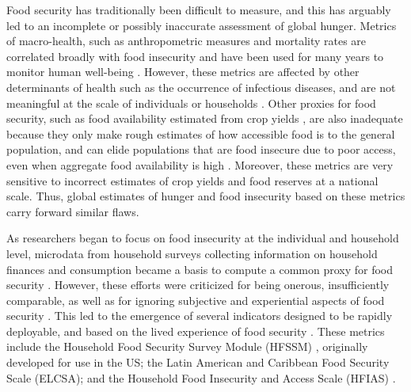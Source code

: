 \documentclass{article}
\begin{document}
Food security has traditionally been difficult to measure, and this has arguably led to an incomplete or possibly inaccurate assessment of global hunger. Metrics of macro-health, such as anthropometric measures and mortality rates are correlated broadly with food insecurity and have been used for many years to monitor human well-being \citep{Puffer1973, Habicht1974}.  However, these metrics are affected by other determinants of health such as the occurrence of infectious diseases, and are not meaningful at the scale of individuals or households \citep{Perumal2018}.  Other proxies for food security, such as food availability estimated from crop yields \citep{Maxwell1992}, are also inadequate because they only make rough estimates of how accessible food is to the general population, and can elide populations that are food insecure due to poor access, even when aggregate food availability is high \citep{Sen1983}.  Moreover, these metrics are very sensitive to incorrect estimates of crop yields and food reserves at a national scale.  Thus, global estimates of hunger and food insecurity based on these metrics carry forward similar flaws.

As researchers began to focus on food insecurity at the individual and household level, microdata from household surveys collecting information on household finances and consumption became a basis to compute a common proxy for food security \citep{Haddad1994}.  However, these efforts were criticized for being onerous, insufficiently comparable, as well as for ignoring subjective and experiential aspects of food security \citep{Maxwell1996}.  This led to the emergence of several indicators designed to be rapidly deployable, and based on the lived experience of food security \citep{Jones2013}.  These metrics include the Household Food Security Survey Module (HFSSM) \citep{kennedy2005keynote}, originally developed for use in the US; the Latin American and Caribbean Food Security Scale (ELCSA); and the Household Food Insecurity and Access Scale (HFIAS) \citep{Coates2007}.
\end{document}
